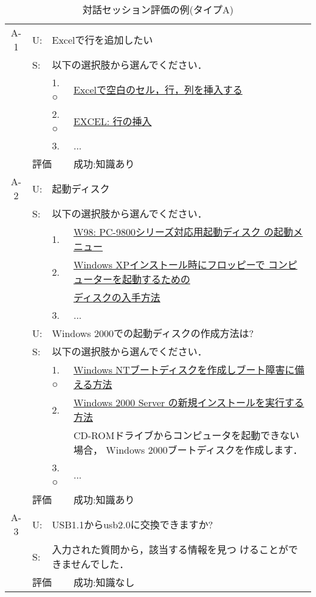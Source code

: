 \begin{table}
 \caption{対話セッション評価の例(タイプA)} \label{tab:対話セッション評価の例(タイプA)}
 \begin{center} \footnotesize
  \begin{tabular}{c|llp{10cm}} \hline
   A-1 & U: & \multicolumn{2}{l}{Excelで行を追加したい} \\
       & S: & \multicolumn{2}{l}{以下の選択肢から選んでください．} \\
       &    & 1. ○ & \underline{Excelで空白のセル，行，列を挿入する} \\
       &    & 2. ○ & \underline{EXCEL: 行の挿入} \\
       &    & 3.    & ... \\ \cline{2-4}
       & \multicolumn{2}{l}{評価} & 成功:知識あり \\ \hline


   A-2 & U: & \multicolumn{2}{l}{起動ディスク} \\
       & S: & \multicolumn{2}{l}{以下の選択肢から選んでください．} \\
       &    & 1.    & \underline{W98: PC-9800シリーズ対応用起動ディスク
       の起動メニュー} \\
       &    & 2.    & \underline{Windows XPインストール時にフロッピーで
       コンピューターを起動するための} \\
       &    &       & \underline{ディスクの入手方法} \\
       &    & 3.    & ... \\
       & U: & \multicolumn{2}{l}{Windows 2000での起動ディスクの作成方法は?} \\
       & S: & \multicolumn{2}{l}{以下の選択肢から選んでください．} \\
       &    & 1. ○ & \underline{Windows NTブートディスクを作成しブート障害に備える方法} \\
       &    & 2.    & \underline{Windows 2000 Server の新規インストールを実行する方法} \\
       &    &       & CD-ROMドライブからコンピュータを起動できない場合，
       Windows 2000ブートディスクを作成します． \\
       &    & 3. ○ & ... \\ \cline{2-4}
       & \multicolumn{2}{l}{評価} & 成功:知識あり \\ \hline

   A-3 & U: & \multicolumn{2}{l}{USB1.1からusb2.0に交換できますか?} \\
       & S: & \multicolumn{2}{l}{入力された質問から，該当する情報を見つ
       けることができませんでした．} \\ \cline{2-4}
       & \multicolumn{2}{l}{評価} & 成功:知識なし \\ \hline


\end{tabular}
\end{center}
\end{table}
